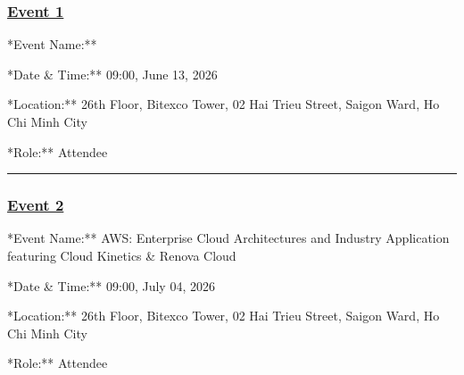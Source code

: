 \subsubsection{\texorpdfstring{\href{4.1-Event1/}{Event
1}}{Event 1}}

\qquad **Event Name:**

\qquad **Date \& Time:** 09:00, June 13, 2026

\qquad **Location:** 26th Floor, Bitexco Tower, 02 Hai Trieu Street,
Saigon Ward, Ho Chi Minh City

\qquad **Role:** Attendee

\begin{center}\rule{0.5\linewidth}{0.5pt}\end{center}

\subsubsection{\texorpdfstring{\href{4.2-Event2/}{Event
2}}{Event 2}}

\qquad **Event Name:** AWS: Enterprise Cloud Architectures and Industry
Application featuring Cloud Kinetics \& Renova Cloud

\qquad **Date \& Time:** 09:00, July 04, 2026

\qquad **Location:** 26th Floor, Bitexco Tower, 02 Hai Trieu Street,
Saigon Ward, Ho Chi Minh City

\qquad **Role:** Attendee
